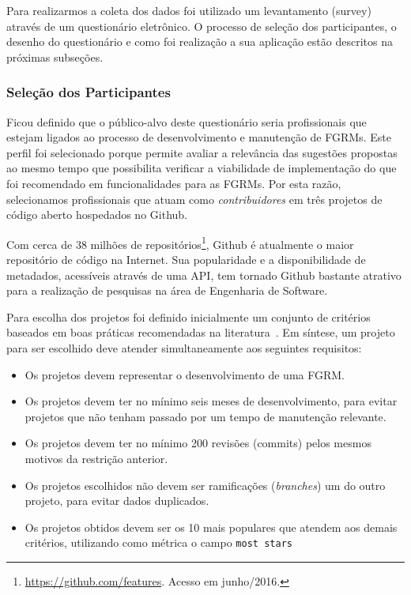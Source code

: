 Para realizarmos a coleta dos dados foi utilizado um levantamento (survey)
através de um questionário eletrônico. O processo de seleção dos participantes,
o desenho do questionário e como foi realização a sua aplicação estão descritos
na próximas subseções.

\subsubsection{Seleção dos Participantes}
\label{ssub:sug_melhoria_selecao_participantes}

Ficou definido que o público-alvo deste questionário seria profissionais que
estejam ligados ao processo de desenvolvimento e manutenção de FGRMs. Este
perfil foi selecionado porque permite avaliar a relevância das sugestões
propostas ao mesmo tempo que possibilita verificar a viabilidade de
implementação do que foi recomendado em funcionalidades para as FGRMs. Por esta
razão, selecionamos profissionais que atuam como \textit{contribuidores} em três
projetos de código aberto hospedados no Github.

Com cerca de 38 milhões de
repositórios\footnote{\url{https://github.com/features}. Acesso em junho/2016.},
Github é atualmente o maior repositório de código na Internet. Sua popularidade
e a disponibilidade de metadados, acessíveis através de uma API, tem tornado
Github bastante atrativo para a realização de pesquisas na área de Engenharia de
Software.

Para escolha dos projetos foi definido inicialmente um conjunto de critérios
baseados em boas práticas recomendadas na literatura~\cite{Bird2009}. Em
síntese, um projeto para ser escolhido deve atender simultaneamente
aos seguintes requisitos:

\begin{itemize}
	\item Os projetos devem representar o desenvolvimento de uma FGRM\@.
	\item Os projetos devem ter no mínimo seis meses de desenvolvimento, para
		evitar projetos que não tenham passado por um tempo de manutenção
		relevante.
	\item Os projetos devem  ter  no  mínimo  200  revisões (commits)  pelos
		mesmos motivos  da restrição anterior.
	\item Os projetos escolhidos não devem ser ramificações (\textsl{branches}) um
		do outro projeto, para evitar dados duplicados.
	\item Os projetos obtidos devem ser os 10 mais populares que atendem aos
		demais critérios, utilizando como métrica o campo \texttt{most stars}
\end{itemize}

